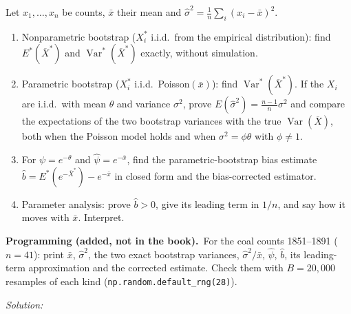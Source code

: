\documentclass[11pt,a4paper]{article}
\newif\ifsolucoes
\newcommand{\espacoresol}{4.5cm}   %
\numberwithin{equation}{questao}   %
\newcommand{\programacao}{\par\smallskip\noindent\textbf{Programming (added, not in the book).}~}
\newcommand{\resolespaco}{\ifsolucoes\else\par\textit{Solution:}\vspace{\espacoresol}\par\fi}
\newcommand{\Var}{\operatorname{Var}}
\newcommand{\1}{\mathbf{1}}
\begin{document}
Let $x_1,\dots,x_n$ be counts, $\bar x$ their mean and $\hat\sigma^2=\frac1n\sum_i(x_i-\bar x)^2$.
\begin{enumerate}[label=\textbf{(\alph*)},leftmargin=2.4em]
\item Nonparametric bootstrap ($X_i^*$ i.i.d.\ from the empirical distribution): find
$E^*(\overline X^*)$ and $\Var^*(\overline X^*)$ exactly, without simulation.
\item Parametric bootstrap ($X_i^*$ i.i.d.\ Poisson$(\bar x)$): find $\Var^*(\overline X^*)$. If the
$X_i$ are i.i.d.\ with mean $\theta$ and variance $\sigma^2$, prove $E(\hat\sigma^2)=\frac{n-1}n\sigma^2$
and compare the expectations of the two bootstrap variances with the true $\Var(\overline X)$, both
when the Poisson model holds and when $\sigma^2=\phi\theta$ with $\phi\ne1$.
\item For $\psi=e^{-\theta}$ and $\hat\psi=e^{-\bar x}$, find the parametric-bootstrap bias estimate
$\hat b=E^*(e^{-\overline X^*})-e^{-\bar x}$ in closed form and the bias-corrected estimator.
\item Parameter analysis: prove $\hat b>0$, give its leading term in $1/n$, and say how it moves with
$\bar x$. Interpret.
\end{enumerate}
\programacao For the coal counts 1851--1891 ($n=41$): print $\bar x$, $\hat\sigma^2$, the two exact
bootstrap variances, $\hat\sigma^2/\bar x$, $\hat\psi$, $\hat b$, its leading-term approximation and
the corrected estimate. Check them with $B=20{,}000$ resamples of each kind
(\texttt{np.random.default\_rng(28)}).
\resolespaco
\end{document}
